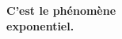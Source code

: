 \documentclass[preview]{standalone}
\begin{document}
\begin{center}
\textbf{C'est le ph\'enom\`ene} \\ \textbf{exponentiel.}
\end{center}
\end{document}
